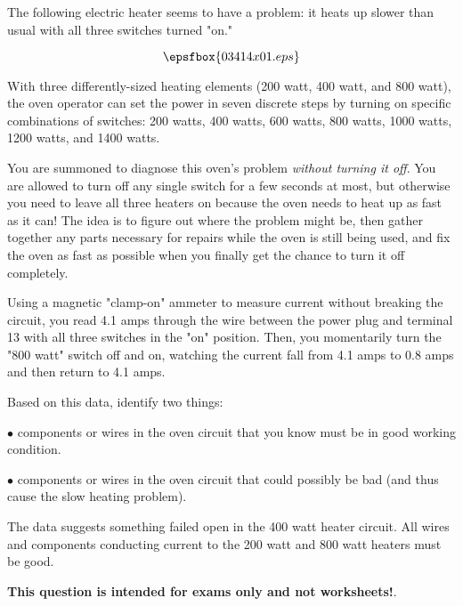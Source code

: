 

The following electric heater seems to have a problem: it heats up slower than usual with all three switches turned "on."

$$\epsfbox{03414x01.eps}$$

With three differently-sized heating elements (200 watt, 400 watt, and 800 watt), the oven operator can set the power in seven discrete steps by turning on specific combinations of switches: 200 watts, 400 watts, 600 watts, 800 watts, 1000 watts, 1200 watts, and 1400 watts.

You are summoned to diagnose this oven's problem {\it without turning it off}.  You are allowed to turn off any single switch for a few seconds at most, but otherwise you need to leave all three heaters on because the oven needs to heat up as fast as it can!  The idea is to figure out where the problem might be, then gather together any parts necessary for repairs while the oven is still being used, and fix the oven as fast as possible when you finally get the chance to turn it off completely.

Using a magnetic "clamp-on" ammeter to measure current without breaking the circuit, you read 4.1 amps through the wire between the power plug and terminal 13 with all three switches in the "on" position.  Then, you momentarily turn the "800 watt" switch off and on, watching the current fall from 4.1 amps to 0.8 amps and then return to 4.1 amps.

Based on this data, identify two things:

\vskip 10pt

\medskip
\item{$\bullet$}  components or wires in the oven circuit that you know must be in good working condition.
\vskip 40pt
\item{$\bullet$}  components or wires in the oven circuit that could possibly be bad (and thus cause the slow heating problem).
\medskip







The data suggests something failed open in the 400 watt heater circuit.  All wires and components conducting current to the 200 watt and 800 watt heaters must be good.







{\bf This question is intended for exams only and not worksheets!}.



